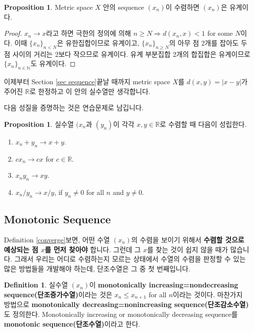 \documentclass[12pt]{article}
\theoremstyle{definition}
\newtheorem{prop}[thm]{Proposition}
\newtheorem{defn}[thm]{Definition}
\def\NN{\mathbb{N}}
\def\RR{\mathbb{R}}
\newcommand{\abs}[1]{\left\vert#1\right\vert}
\begin{document}
	\begin{prop} \label{conv bdd}
		Metric space \(X\) 안의 sequence \((x_n)\)이 수렴하면 \((x_n)\)은 유계이다.
	\end{prop}
	\begin{proof}
		\(x_n \rightarrow x\)라고 하면 극한의 정의에 의해 \(n \ge N \Rightarrow d(x_n, x) < 1\) for some \(N\)이다. 이때 \(\{x_n\}_{n < N}\)은 유한집합이므로 유계이고, \(\{x_n\}_{n \ge N}\)의 아무 점 2개를 잡아도 두 점 사이의 거리는 2보다 작으므로 유계이다. 유계 부분집합 2개의 합집합은 유계이므로 \(\{x_n\}_{n \in \NN}\)도 유계이다.
	\end{proof}

이제부터 Section \ref{sec sequence}\가 끝날 때까지 metric space \(X\)를 \(d(x, y) = \abs{x - y}\)가 주어진 \(\RR\)로 한정하고 이 안의 실수열만 생각합니다.

다음 성질을 증명하는 것은 연습문제로 남깁니다.

	\begin{prop}
		실수열 \((x_n\)과 \((y_n)\)이 각각 \(x, y \in \RR\)로 수렴할 때 다음이 성립한다.
		\begin{enumerate} [label=(\alph*), leftmargin=2\parindent]
			\item
			\(x_n + y_n \rightarrow x + y\).
			\item
			\(cx_n \rightarrow cx\) for \(c \in \RR\).
			\item
			\(x_ny_n \rightarrow xy\).
			\item
			\(x_n/y_n \rightarrow x/y\), if \(y_n \neq 0\) for all \(n\) and \(y \neq 0\).
		\end{enumerate}
	\end{prop}

\subsection{Monotonic Sequence}

Definition \ref{converge}\를 보면, 어떤 수열 \((x_n)\)의 수렴을 보이기 위해서 \textbf{수렴할 것으로 예상되는 점 \(x\)를 먼저 찾아야} 합니다. 그런데 그 \(x\)를 찾는 것이 쉽지 않을 때가 많습니다. 그래서 우리는 어디로 수렴하는지 모르는 상태에서 수열의 수렴을 판정할 수 있는 많은 방법들을 개발해야 하는데, 단조수열은 그 중 첫 번째입니다.

	\begin{defn}
		실수열 \((x_n)\)이 \textbf{monotonically increasing=nondecreasing sequence(단조증가수열)}이라는 것은 \(x_n \le x_{n+1}\) for all \(n\)이라는 것이다. 마찬가지 방법으로 \textbf{monotonically decreasing=nonincreasing sequence(단조감소수열)}도 정의한다. Monotonically increasing or monotonically decreasing sequence를 \textbf{monotonic sequence(단조수열)}이라고 한다.
	\end{defn}
\end{document}
